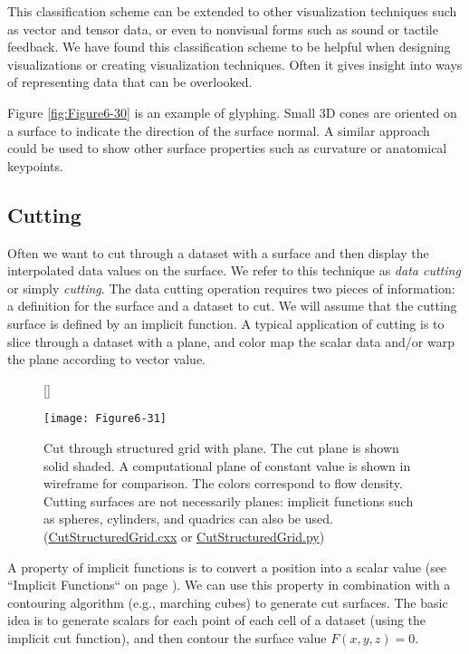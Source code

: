 This classification scheme can be extended to other visualization techniques such as vector and tensor data, or even to nonvisual forms such as sound or tactile feedback. We have found this classification scheme to be helpful when designing visualizations or creating visualization techniques. Often it gives insight into ways of representing data that can be overlooked.

Figure \ref{fig:Figure6-30} is an example of glyphing. Small 3D cones are oriented on a surface to indicate the direction of the surface normal. A similar approach could be used to show other surface properties such as curvature or anatomical keypoints.

\subsection{Cutting}
\label{subsec:cutting}

Often we want to cut through a dataset with a surface and then display the interpolated data values on the surface. We refer to this technique as \emph{data cutting} or simply \emph{cutting}. The data cutting operation requires two pieces of information: a definition for the surface and a dataset to cut. We will assume that the cutting surface is defined by an implicit function. A typical application of cutting is to slice through a dataset with a plane, and color map the scalar data and/or warp the plane according to vector value.

\begin{figure}[!htb]
	[\FBwidth]
	{\caption{ Cut through structured grid with plane. The cut plane is shown solid shaded. A computational plane of constant value is shown in wireframe for comparison. The colors correspond to flow density. Cutting surfaces are not necessarily planes: implicit functions such as spheres, cylinders, and quadrics can also be used. (\href{https://lorensen.github.io/VTKExamples/site/Cxx/VisualizationAlgorithms/CutStructuredGrid/}{CutStructuredGrid.cxx} or \href{https://lorensen.github.io/VTKExamples/site/Python/VisualizationAlgorithms/CutStructuredGrid/}{CutStructuredGrid.py})}\label{fig:Figure6-31}}
	{\texttt{[image: Figure6-31]}}
\end{figure}

A property of implicit functions is to convert a position into a scalar value (see ``Implicit Functions`` on page \pageref{subsec:implicit_functions} ). We can use this property in combination with a contouring algorithm (e.g., marching cubes) to generate cut surfaces. The basic idea is to generate scalars for each point of each cell of a dataset (using the implicit cut function), and then contour the surface value $F(x,y,z) = 0$.

